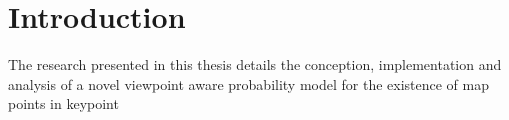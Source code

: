 \section{Introduction}

The research presented in this thesis details the conception, implementation and analysis of a novel viewpoint aware probability model for the existence of map points in keypoint







